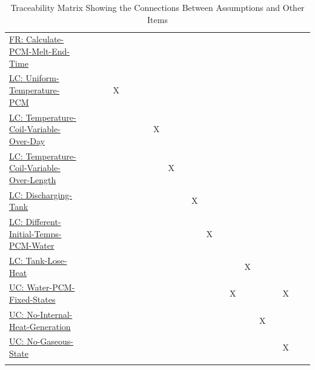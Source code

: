 \documentclass[12pt]{article}
\begin{document}
\begin{longtable}{l l l l l l l l l l l l l l l l l l l l l}
\\
\hyperref[calcPCMMeltEnd]{FR: Calculate-PCM-Melt-End-Time} &  &  &  &  &  &  &  &  &  &  &  &  &  &  &  &  &  &  &  & 
\\
\hyperref[likeChgUTP]{LC: Uniform-Temperature-PCM} &  &  &  & X &  &  &  &  &  &  &  &  &  &  &  &  &  &  &  & 
\\
\hyperref[likeChgTCVOD]{LC: Temperature-Coil-Variable-Over-Day} &  &  &  &  &  &  &  & X &  &  &  &  &  &  &  &  &  &  &  & 
\\
\hyperref[likeChgTCVOL]{LC: Temperature-Coil-Variable-Over-Length} &  &  &  &  &  &  &  &  & X &  &  &  &  &  &  &  &  &  &  & 
\\
\hyperref[likeChgDT]{LC: Discharging-Tank} &  &  &  &  &  &  &  &  &  &  & X &  &  &  &  &  &  &  &  & 
\\
\hyperref[likeChgDITPW]{LC: Different-Initial-Temps-PCM-Water} &  &  &  &  &  &  &  &  &  &  &  & X &  &  &  &  &  &  &  & 
\\
\hyperref[likeChgTLH]{LC: Tank-Lose-Heat} &  &  &  &  &  &  &  &  &  &  &  &  &  &  & X &  &  &  &  & 
\\
\hyperref[unlikeChgWPFS]{UC: Water-PCM-Fixed-States} &  &  &  &  &  &  &  &  &  &  &  &  &  & X &  &  &  & X &  & 
\\
\hyperref[unlikeChgNIHG]{UC: No-Internal-Heat-Generation} &  &  &  &  &  &  &  &  &  &  &  &  &  &  &  & X &  &  &  & 
\\
\hyperref[unlikeChgNGS]{UC: No-Gaseous-State} &  &  &  &  &  &  &  &  &  &  &  &  &  &  &  &  &  & X &  & 
\\
\bottomrule
\caption{Traceability Matrix Showing the Connections Between Assumptions and Other Items}
\label{Table:TraceMatAvsAll}
\end{longtable}
\end{document}
